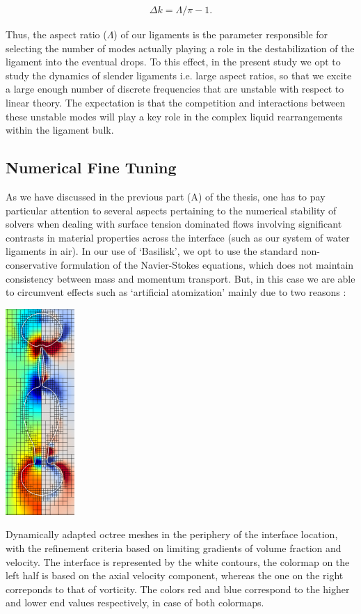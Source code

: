 \begin{align}
 \Delta k = \Lambda / \pi - 1 .  
\end{align}

Thus, the aspect ratio ($\Lambda$) of our ligaments is the parameter 
responsible for selecting the number of modes actually playing a 
role in the destabilization of the ligament into the eventual drops. 
To this effect, in the present study we opt to study the dynamics of 
slender ligaments i.e. large aspect ratios, so that we excite a large enough 
number of discrete frequencies that are unstable with respect to linear theory. 
The expectation is that the competition and interactions 
between these unstable modes will play a key role in the
complex liquid rearrangements within the ligament bulk. 

\subsection*{Numerical Fine Tuning}
As we have discussed in the previous part (A) of the thesis,  
one has to pay particular attention to several aspects pertaining to 
the numerical stability of solvers when dealing with surface tension 
dominated flows involving significant contrasts in material properties 
across the interface (such as our system of water ligaments in air). 
In our use of `Basilisk', we opt to use the standard non-conservative
formulation of the Navier-Stokes equations, which does not maintain 
consistency between mass and momentum transport. 
But, in this case we are able to circumvent effects such as `artificial
atomization' mainly due to two reasons :

\begin{marginfigure}
\centering
\includegraphics{plots/ligament_breakup/lig_mesh.pdf}
\caption{ Dynamically adapted octree meshes in the periphery 
of the interface location, with the refinement criteria based on
limiting gradients of volume fraction and velocity. The interface
is represented by the white contours, the colormap on the left half is
based on the axial velocity component, whereas the one on the right 
correponds to that of vorticity. 
The colors red and blue correspond to 
the higher and lower end values respectively, in case of both colormaps. 
	}
\label{lig_mesh}
\end{marginfigure}

